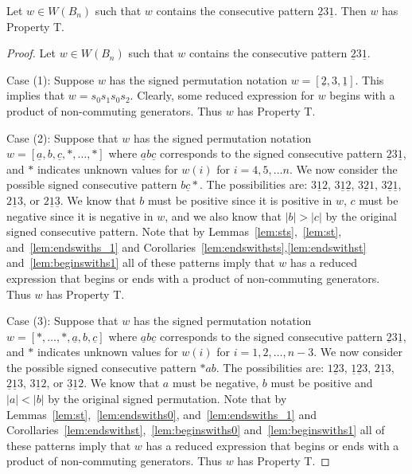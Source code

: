 \begin{lemma}\label{lem:2312}
Let $w \in W(B_n)$ such that $w$ contains the consecutive pattern $\underline{2}3\underline{1}$. Then $w$ has Property T.
\begin{proof}
	Let $w \in W(B_n)$ such that $w$ contains the consecutive pattern $\underline{2}3\underline{1}$.
	
	Case (1): Suppose $w$ has the signed permutation notation $w=[\underline{2},3,\underline{1}]$. This implies that $w=s_0s_1s_0s_2$. Clearly, some reduced expression for $w$ begins with a product of non-commuting generators. Thus $w$ has Property T.
	
	Case (2): Suppose that $w$ has the signed permutation notation $w=[\underline{a},b,\underline{c}, \ast, \ldots, \ast]$ where $\underline{a}b\underline{c}$ corresponds to the signed consecutive pattern $\underline{2}3\underline{1}$, and $\ast$ indicates unknown values for $w(i)$ for $i=4,5, \ldots n$. We now consider the possible signed consecutive pattern $b \underline{c} \ast$. The possibilities are: $3\underline{1}2$, $3\underline{1}\underline{2}$, $3\underline{2}1$, $3 \underline{2}\underline{1}$, $2\underline{1}3$, or $2\underline{1}\underline{3}$. We know that $b$ must be positive since it is positive in $w$, $c$ must be negative since it is negative in $w$, and we also know that $|b|>|c|$ by the original signed consecutive pattern. Note that by Lemmas~\ref{lem:sts},~\ref{lem:st}, and~\ref{lem:endswiths_1} and Corollaries~\ref{lem:endswithsts},\ref{lem:endswithst} and~\ref{lem:beginswiths1} all of these patterns imply that $w$ has a reduced expression that begins or ends with a product of non-commuting generators. Thus $w$ has Property T.
	
	Case (3): Suppose that $w$ has the signed permutation notation $w=[\ast, \ldots, \ast, \underline{a},b,\underline{c}]$ where $\underline{a}b\underline{c}$ corresponds to the signed consecutive pattern $\underline{2}3\underline{1}$, and $\ast$ indicates unknown values for $w(i)$ for $i=1,2, \ldots ,n-3$. We now consider the possible signed consecutive pattern $\ast ab$. The possibilities are: $1 \underline{2} 3$, $\underline{1} \underline{2} 3$, $2 \underline{1} 3$, $\underline{2} \underline{1} 3$, $3 \underline{1} 2$, or $\underline{3} \underline{1} 2$. We know that $a$ must be negative, $b$ must be positive and $|a|<|b|$ by the original signed permutation. Note that by Lemmas~\ref{lem:st},~\ref{lem:endswiths0}, and~\ref{lem:endswiths_1} and Corollaries~\ref{lem:endswithst},~\ref{lem:beginswiths0} and~\ref{lem:beginswiths1} all of these patterns imply that $w$ has a reduced expression that begins or ends with a product of non-commuting generators. Thus $w$ has Property T. 


\end{proof}
\end{lemma}
